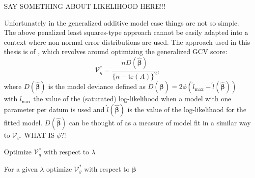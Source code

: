 SAY SOMETHING ABOUT LIKELIHOOD HERE!!!

Unfortunately in the generalized additive model case things are not so simple. The above penalized least squares-type approach cannot be easily adapted into a context where non-normal error distributions are used. The approach used in this thesis is of , which revolves around optimizing the generalized GCV score:
\begin{equation}
\mathcal{V}^*_g = \frac{n D(\bm{\hat{\beta}})}{\{n-\text{tr}(A)\}^2},
\label{intro-GCV2008}
\end{equation}
where $D(\bm{\hat{\beta}})$ is the model deviance defined as $D(\bm{\hat{\beta}}) = 2\phi (\hat{l}_\text{max} - \hat{l}(\bm{\hat{\beta}}))$ with $\hat{l}_\text{max}$ the value of the (saturated) log-likelihood when a model with one parameter per datum is used and $\hat{l}(\bm{\hat{\beta}})$ is the value of the log-likelihood for the fitted model. $D(\bm{\hat{\beta}})$ can be thought of as a measure of model fit in a similar way to $\mathcal{V}_g$. WHAT IS $\phi$?!

Optimize $\mathcal{V}^*_g$ with respect to $\lambda$

For a given $\lambda$ optimize $\mathcal{V}^*_g$ with respect to $\bm{\beta}$




